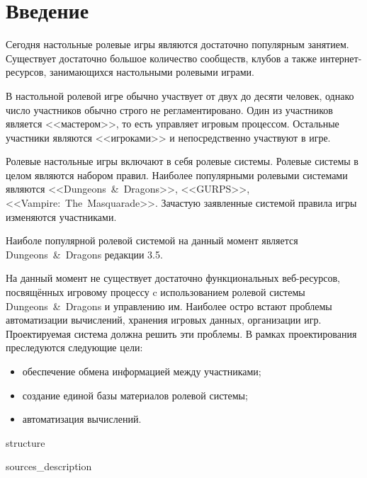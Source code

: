 \section*{Введение}

Сегодня настольные ролевые игры являются достаточно популярным занятием. Существует достаточно большое количество сообществ, клубов а также интернет-ресурсов, занимающихся настольными ролевыми играми. %

В настольной ролевой игре обычно участвует от двух до десяти человек, однако число участников обычно строго не регламентировано. Один из участников является <<мастером>>, то есть управляет игровым процессом. Остальные участники являются <<игроками>> и непосредственно участвуют в игре.

Ролевые настольные игры включают в себя ролевые системы. Ролевые системы в целом являются набором правил. Наиболее популярными ролевыми системами являются <<Dungeons~\&~Dragons>>, <<GURPS>>, <<Vampire:~The~Masquarade>>. Зачастую заявленные системой правила игры изменяются участниками.

Наиболе популярной ролевой системой на данный момент является Dungeons~\&~Dragons редакции 3.5.

На данный момент не существует достаточно функциональных веб-ресурсов, посвящённых игровому процессу c использованием ролевой системы Dungeons~\&~Dragons и управлению им. Наиболее остро встают проблемы автоматизации вычислений, хранения игровых данных, организации игр. Проектируемая система должна решить эти проблемы.
В рамках проектирования преследуются следующие цели:
\begin{itemize}
\item обеспечение обмена информацией между участниками;
\item создание единой базы материалов ролевой системы;
\item автоматизация вычислений.
\end{itemize}

{structure}

{sources_description}

\pagebreak
